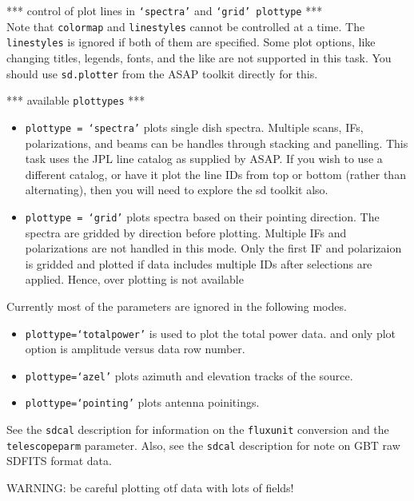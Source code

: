 *** control of plot lines in {\tt `spectra'} and {\tt `grid' plottype} ***\\
Note that {\tt colormap} and {\tt linestyles} cannot be controlled at a time.
The {\tt linestyles} is ignored if both of them are specified.
Some plot options, like changing titles, legends, fonts,
and the like are not supported in this task.  You should use
{\tt sd.plotter} from the ASAP toolkit directly for this.

*** available {\tt plottypes} ***
\begin{itemize}
\item {\tt plottype = `spectra'} plots single dish spectra. Multiple scans,
IFs, polarizations, and beams can be handles through stacking
and panelling.
This task uses the JPL line catalog as supplied by ASAP.
If you wish to use a different catalog, or have it plot
the line IDs from top or bottom (rather than alternating),
then you will need to explore the sd toolkit also.
\item {\tt plottype = `grid'} plots spectra based on their pointing direction.
The spectra are gridded by direction before plotting.
Multiple IFs and polarizations are not handled in this mode. Only
the first IF and polarizaion is gridded and plotted if data 
includes multiple IDs after selections are applied. Hence, over
plotting is not available
\end{itemize}

Currently most of the parameters are ignored in the following modes.
\begin{itemize}
\item {\tt plottype=`totalpower'} is used to plot the total power data.
and only plot option is amplitude versus data row number.
\item {\tt plottype=`azel'} plots azimuth and elevation tracks of the source.
\item {\tt plottype=`pointing'} plots antenna poinitings.
\end{itemize}

See the {\tt sdcal} description for information on the {\tt fluxunit} conversion
and the {\tt telescopeparm} parameter.
Also, see the {\tt sdcal} description for note on GBT raw SDFITS format data.

WARNING: be careful plotting otf data with lots of fields!

